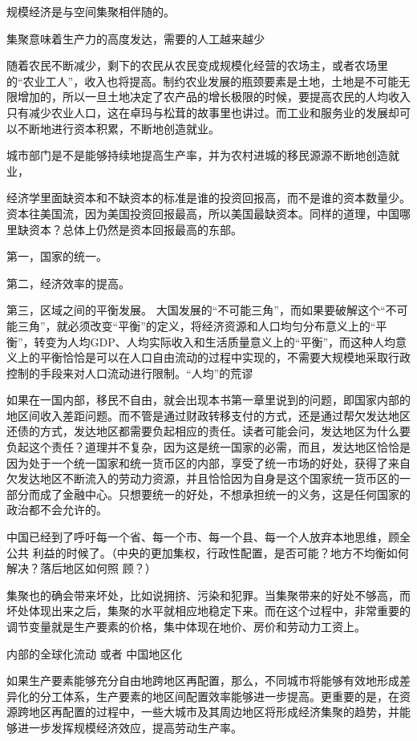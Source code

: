 规模经济是与空间集聚相伴随的。

集聚意味着生产力的高度发达，需要的人工越来越少

随着农民不断减少，剩下的农民从农民变成规模化经营的农场主，或者农场里的“农业工人”，收入也将提高。制约农业发展的瓶颈要素是土地，土地是不可能无限增加的，所以一旦土地决定了农产品的增长极限的时候，要提高农民的人均收入只有减少农业人口，这在卓玛与松茸的故事里也讲过。而工业和服务业的发展却可以不断地进行资本积累，不断地创造就业。

城市部门是不是能够持续地提高生产率，并为农村进城的移民源源不断地创造就业，

经济学里面缺资本和不缺资本的标准是谁的投资回报高，而不是谁的资本数量少。资本往美国流，因为美国投资回报最高，所以美国最缺资本。同样的道理，中国哪里缺资本？总体上仍然是资本回报最高的东部。

第一，国家的统一。

第二，经济效率的提高。

第三，区域之间的平衡发展。
大国发展的“不可能三角”，而如果要破解这个“不可能三角”，就必须改变“平衡”的定义，将经济资源和人口均匀分布意义上的“平衡”，转变为人均GDP、人均实际收入和生活质量意义上的“平衡”，而这种人均意义上的平衡恰恰是可以在人口自由流动的过程中实现的，不需要大规模地采取行政控制的手段来对人口流动进行限制。“人均”的荒谬


如果在一国内部，移民不自由，就会出现本书第一章里说到的问题，即国家内部的地区间收入差距问题。而不管是通过财政转移支付的方式，还是通过帮欠发达地区还债的方式，发达地区都需要负起相应的责任。读者可能会问，发达地区为什么要负起这个责任？道理并不复杂，因为这是统一国家的必需，而且，发达地区恰恰是因为处于一个统一国家和统一货币区的内部，享受了统一市场的好处，获得了来自欠发达地区不断流入的劳动力资源，并且恰恰因为自身是这个国家统一货币区的一部分而成了金融中心。只想要统一的好处，不想承担统一的义务，这是任何国家的政治都不会允许的。


中国已经到了呼吁每一个省、每一个市、每一个县、每一个人放弃本地思维，顾全公共
利益的时候了。（中央的更加集权，行政性配置，是否可能？地方不均衡如何解决？落后地区如何照
顾？）

集聚也的确会带来坏处，比如说拥挤、污染和犯罪。当集聚带来的好处不够高，而坏处体现出来之后，集聚的水平就相应地稳定下来。而在这个过程中，非常重要的调节变量就是生产要素的价格，集中体现在地价、房价和劳动力工资上。


内部的全球化流动 或者 中国地区化

如果生产要素能够充分自由地跨地区再配置，那么，不同城市将能够有效地形成差异化的分工体系，生产要素的地区间配置效率能够进一步提高。更重要的是，在资源跨地区再配置的过程中，一些大城市及其周边地区将形成经济集聚的趋势，并能够进一步发挥规模经济效应，提高劳动生产率。

